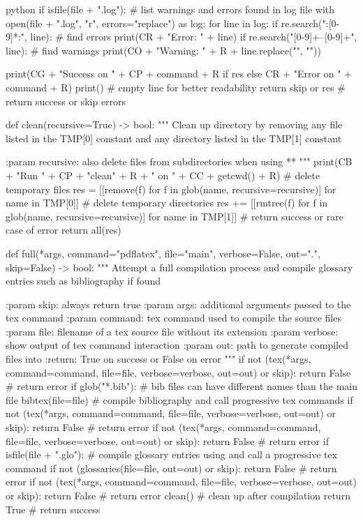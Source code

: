 \documentclass[minted]{protocol}
\begin{document}
\begin{code}{python}
    if isfile(file + ".log"):           # list warnings and errors found in log file
        with open(file + ".log", "r", errors="replace") as log:
            for line in log:
                if re.search(":[0-9]*:", line):         # find errors
                    print(CR + "Error: " + line)
                if re.search("[0-9]+--[0-9]+", line):   # find warnings
                    print(CO + "Warning: " + R + line.replace("\n", ""))

    print(CG + "Success on " + CP + command + R if res else CR + "Error on " + command + R)
    print()                 # empty line for better readability
    return skip or res      # return success or skip errors


def clean(recursive=True) -> bool:
    """
    Clean up directory by removing any file listed in the TMP[0] constant
    and any directory listed in the TMP[1] constant

    :param recursive: also delete files from subdirectories when using **
    """
    print(CB + "Run " + CP + "clean" + R + " on " + CC + getcwd() + R)
    # delete temporary files
    res = [[remove(f) for f in glob(name, recursive=recursive)] for name in TMP[0]]
    # delete temporary directories
    res += [[rmtree(f) for f in glob(name, recursive=recursive)] for name in TMP[1]]
    # return success or rare case of error
    return all(res)


def full(*args, command="pdflatex", file="main", verbose=False, out=".", skip=False) -> bool:
    """
    Attempt a full compilation process and compile glossary entries such as bibliography if found

    :param skip: always return true
    :param args: additional arguments passed to the tex command
    :param command: tex command used to compile the source files
    :param file: filename of a tex source file without its extension
    :param verbose: show output of tex command interaction
    :param out: path to generate compiled files into
    :return: True on success or False on error
    """
    if not (tex(*args, command=command, file=file, verbose=verbose, out=out) or skip):
        return False            # return error
    if glob("*.bib"):  # bib files can have different names than the main file
        bibtex(file=file)       # compile bibliography and call progressive tex commands
        if not (tex(*args, command=command, file=file, verbose=verbose, out=out) or skip):
            return False        # return error
        if not (tex(*args, command=command, file=file, verbose=verbose, out=out) or skip):
            return False        # return error
    if isfile(file + ".glo"):   # compile glossary entries using and call a progressive tex command
        if not (glossaries(file=file, out=out) or skip):
            return False        # return error
        if not (tex(*args, command=command, file=file, verbose=verbose, out=out) or skip):
            return False        # return error
    clean()                     # clean up after compilation
    return True                 # return success



\end{code}
\end{document}
